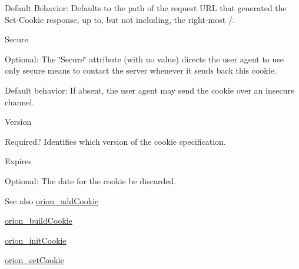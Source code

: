 \begin{DoxyItemize}
\begin{DoxyItemize}
\item Default Behavior: Defaults to the path of the request URL that generated the Set-\/Cookie response, up to, but not including, the right-\/most /. \par

\end{DoxyItemize}
\item Secure\par

\begin{DoxyItemize}
\item Optional: The \char`\"{}Secure\char`\"{} attribute (with no value) directs the user agent to use only secure means to contact the server whenever it sends back this cookie.\par

\item Default behavior: If absent, the user agent may send the cookie over an insecure channel.\par

\end{DoxyItemize}
\item Version\par

\begin{DoxyItemize}
\item Required? Identifies which version of the cookie specification.\par

\end{DoxyItemize}
\item Expires\par

\begin{DoxyItemize}
\item Optional: The date for the cookie be discarded.\par

\end{DoxyItemize}
\end{DoxyItemize}

\begin{DoxySeeAlso}{See also}
\hyperlink{http_8h_a7233006567dd2ae2e3392f1857be4bf6}{orion\_\-addCookie} 

\hyperlink{http_8h_a201e0c2ebbb16ae9ee73ad90bc00719b}{orion\_\-buildCookie} 

\hyperlink{http_8h_ac4bb457d80fc24708ac9daa5efcb3a24}{orion\_\-initCookie} 

\hyperlink{http_8h_af8f1b77f183f69e278654833c4e74f6b}{orion\_\-setCookie} 
\end{DoxySeeAlso}


